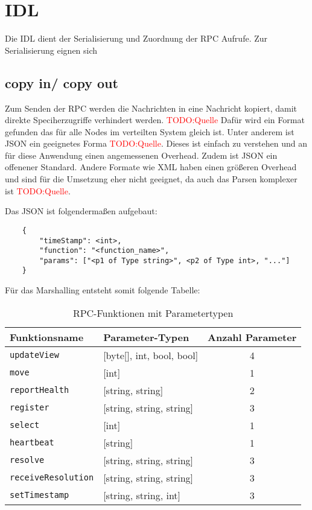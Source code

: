 \section{IDL}

Die IDL dient der Serialisierung und Zuordnung der RPC Aufrufe. Zur Serialisierung eignen sich 
\subsection{copy in/ copy out}
Zum Senden der RPC werden die Nachrichten in eine Nachricht kopiert, damit direkte Speciherzugriffe verhindert werden.  \textcolor{red}{TODO:Quelle} Dafür wird ein Format gefunden das für alle Nodes im verteilten System gleich ist. Unter anderem ist JSON ein geeignetes Forma  \textcolor{red}{TODO:Quelle}.  Dieses ist einfach zu verstehen und an für diese Anwendung einen angemessenen Overhead. Zudem ist JSON ein offenener Standard. Andere Formate wie XML haben einen größeren Overhead und sind für die Umsetzung eher nicht geeignet, da auch das Parsen komplexer ist  \textcolor{red}{TODO:Quelle}.  


Das JSON ist folgendermaßen aufgebaut:

\begin{verbatim}
	{
		"timeStamp": <int>,
		"function": "<function_name>",
		"params": ["<p1 of Type string>", <p2 of Type int>, "..."]
	}
\end{verbatim}


Für das Marshalling entsteht somit folgende Tabelle:


\begin{table}[h!]
	\centering
	\begin{tabular}{|l|l|c|}
		\hline
		\textbf{Funktionsname} & \textbf{Parameter-Typen} & \textbf{Anzahl Parameter} \\
		\hline
		\texttt{updateView} & [byte[], int, bool, bool] & 4 \\
		\texttt{move} & [int] & 1 \\
		\texttt{reportHealth} & [string, string] & 2 \\
		\texttt{register} & [string, string, string] & 3 \\
		\texttt{select} & [int] & 1 \\
		\texttt{heartbeat} & [string] & 1 \\
		\texttt{resolve} & [string, string, string] & 3 \\
		\texttt{receiveResolution} & [string, string, string] & 3 \\
		\texttt{setTimestamp} & [string, string, int] & 3 \\
		
		\hline
	\end{tabular}
	\caption{RPC-Funktionen mit Parametertypen}
\end{table}

